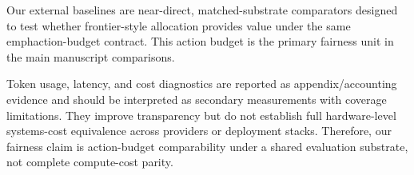 Our external baselines are near-direct, matched-substrate comparators designed to test whether frontier-style allocation provides value under the same \\emph{action-budget} contract. This action budget is the primary fairness unit in the main manuscript comparisons.

Token usage, latency, and cost diagnostics are reported as appendix/accounting evidence and should be interpreted as secondary measurements with coverage limitations. They improve transparency but do not establish full hardware-level systems-cost equivalence across providers or deployment stacks. Therefore, our fairness claim is action-budget comparability under a shared evaluation substrate, not complete compute-cost parity.
